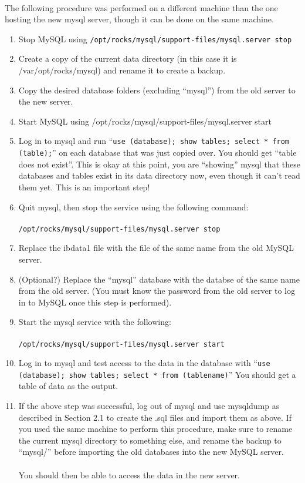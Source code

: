 \documentclass[12pt]{article}
\begin{document}
\paragraph{} The following procedure was performed on a different machine than the one hosting the new mysql server, though it can be done on the same machine.
\begin{enumerate}
\item Stop MySQL using {\tt /opt/rocks/mysql/support-files/mysql.server stop}
\item Create a copy of the current data directory (in this case it is /var/opt/rocks/mysql) and rename it to create a backup. 
\item Copy the desired database folders (excluding ``mysql'') from the old server to the new server.
\item Start MySQL using /opt/rocks/mysql/support-files/mysql.server start
\item Log in to mysql and run ``{\tt use (database); show tables; select * from (table);}'' on each database that was just copied over. You should get ``table does not exist''. This is okay at this point, you are ``showing'' mysql that these databases and tables exist in its data directory now, even though it can't read them yet. This is an important step! 
\item Quit mysql, then stop the service using the following command:
  \paragraph{} {\tt /opt/rocks/mysql/support-files/mysql.server stop}
\item Replace the ibdata1 file with the file of the same name from the old MySQL server.
\item (Optional?) Replace the ``mysql'' database with the databse of the same name from the old server. (You must know the password from the old server to log in to MySQL once this step is performed). 
\item Start the mysql service with the following:
  \paragraph{} {\tt /opt/rocks/mysql/support-files/mysql.server start}
\item Log in to mysql and test access to the data in the database with ``{\tt use (database); show tables; select * from (tablename)}'' You should get a table of data as the output.
\item If the above step was successful, log out of mysql and use mysqldump as described in Section 2.1 to create the .sql files and import them as above. If you used the same machine to perform this procedure, make sure to rename the current mysql directory to something else, and rename the backup to ``mysql/'' before importing the old databases into the new MySQL server.
\paragraph{} You should then be able to access the data in the new server.
\end{enumerate}
\end{document}
